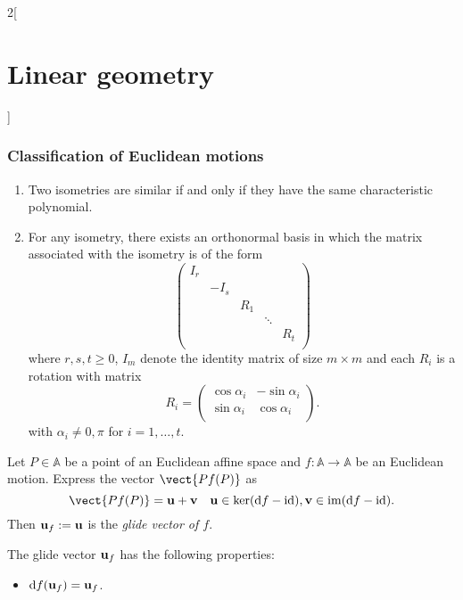 \documentclass[../../../main.tex]{subfiles}
\begin{document}
\begin{multicols}{2}[\section{Linear geometry}]
    \subsubsection{Classification of Euclidean motions}
    \begin{theorem}
        \hfill
        \begin{enumerate}
            \item Two isometries are similar if and only if they have the same characteristic polynomial.
            \item For any isometry, there exists an orthonormal basis in which the matrix associated with the isometry is of the form  $$\begin{pmatrix}
                          I_r &      &     &        &     \\
                              & -I_s &     &        &     \\
                              &      & R_1 &        &     \\
                              &      &     & \ddots &     \\
                              &      &     &        & R_t \\
                      \end{pmatrix}$$ where $r,s,t\geq 0$, $I_m$ denote the identity matrix of size $m\times m$ and each $R_i$ is a rotation with matrix $$R_i=\begin{pmatrix}
                          \cos\alpha_i & -\sin\alpha_i \\
                          \sin\alpha_i & \cos\alpha_i  \\
                      \end{pmatrix}.$$ with $\alpha_i\ne0,\pi$ for $i=1,\ldots,t$.
        \end{enumerate}
    \end{theorem}
    \begin{definition}
        Let $P\in\mathbb{A}$ be a point of an Euclidean affine space and $f:\mathbb{A}\rightarrow\mathbb{A}$ be an Euclidean motion. Express the vector $\vect{Pf(P)}$ as $$\vect{Pf(P)}=\vf{u}+\vf{v}\quad\vf{u}\in\ker(\dd f-\id),\vf{v}\in\im(\dd f-\id).$$ Then $\boldsymbol{\mathrm{u}}_f:=\boldsymbol{\mathrm{u}}$ is the \textit{glide vector of $f$}.
    \end{definition}
    \begin{prop}
        The glide vector $\boldsymbol{\mathrm{u}}_f$ has the following properties:
        \begin{itemize}
            \item $\dd f(\boldsymbol{\mathrm{u}}_f)=\boldsymbol{\mathrm{u}}_f$.

\end{itemize}
\end{prop}
\end{multicols}
\end{document}
